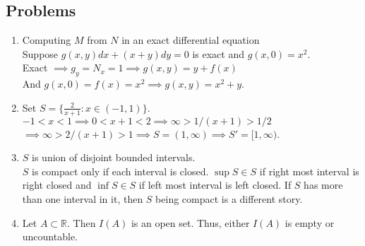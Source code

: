 \subsection*{Problems}
\begin{enumerate}
	\item Computing $M$ from $N$ in an exact differential equation\\
		Suppose $g(x,y)dx + (x+y)dy = 0$ is exact and $g(x,0) = x^2$.\\
		Exact $\implies g_y = N_x = 1 \implies g(x,y) = y+f(x)$\\ And $g(x,0) = f(x) = x^2 \implies g(x,y) = x^2+y$.
	\item Set $S = \{ \frac{2}{x+1} : x \in (-1,1) \}$.\\
		$-1 < x < 1 \implies 0 < x+1 < 2 \implies \infty > 1/(x+1) > 1/2$\\
		$\implies \infty > 2/(x+1) > 1 \implies S = (1,\infty) \implies S' = [1,\infty)$.
	\item $S$ is union of disjoint bounded intervals.\\
		$S$ is compact only if each interval is closed. $\sup S \in S$ if right most interval is right closed and $\inf S \in S$ if left most interval is left closed. If $S$ has more than one interval in it, then $S$ being compact is a different story.
	\item Let $A \subset \mathbb{R}$. Then $I(A)$ is an open set. Thus, either $I(A)$ is empty or uncountable.
\end{enumerate}

